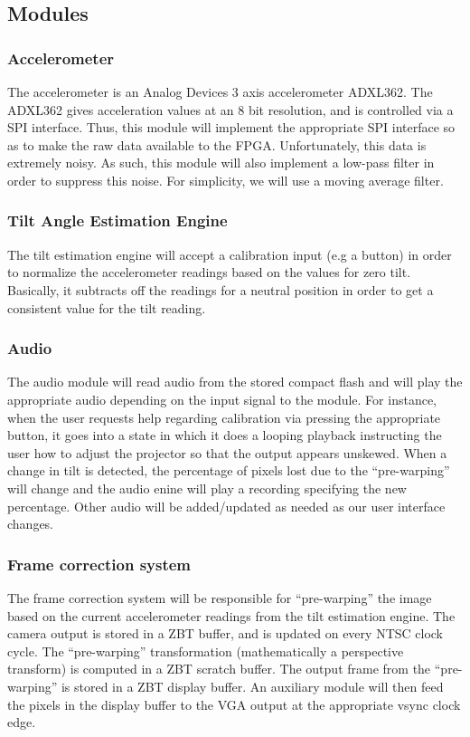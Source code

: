 \documentclass{article}
\begin{document}
\subsection{Modules}

\subsubsection{Accelerometer}
The accelerometer is an Analog Devices 3 axis accelerometer ADXL362.
The ADXL362 gives acceleration values at an 8 bit resolution, and is controlled via a SPI interface.
Thus, this module will implement the appropriate SPI interface so as to make the raw data available to the FPGA.
Unfortunately, this data is extremely noisy.
As such, this module will also implement a low-pass filter in order to suppress this noise.
For simplicity, we will use a moving average filter.

\subsubsection{Tilt Angle Estimation Engine}
The tilt estimation engine will accept a calibration input (e.g a button) in order to normalize the accelerometer readings based on the values for zero tilt.
Basically, it subtracts off the readings for a neutral position in order to get a consistent value for the tilt reading.

\subsubsection{Audio}
The audio module will read audio from the stored compact flash and will play the appropriate audio depending on the input signal to the module.
For instance, when the user requests help regarding calibration via pressing the appropriate button,
it goes into a state in which it does a looping playback instructing the user how to adjust the projector so that the output appears unskewed.
When a change in tilt is detected,
the percentage of pixels lost due to the ``pre-warping'' will change and the audio enine will play a recording specifying the new percentage.
Other audio will be added/updated as needed as our user interface changes.

\subsubsection{Frame correction system}
The frame correction system will be responsible for ``pre-warping'' the image based on the current accelerometer readings from the tilt estimation engine.
The camera output is stored in a ZBT buffer, and is updated on every NTSC clock cycle.
The ``pre-warping'' transformation (mathematically a perspective transform) is computed in a ZBT scratch buffer.
The output frame from the ``pre-warping'' is stored in a ZBT display buffer.
An auxiliary module will then feed the pixels in the display buffer to the VGA output at the appropriate vsync clock edge.
\end{document}
